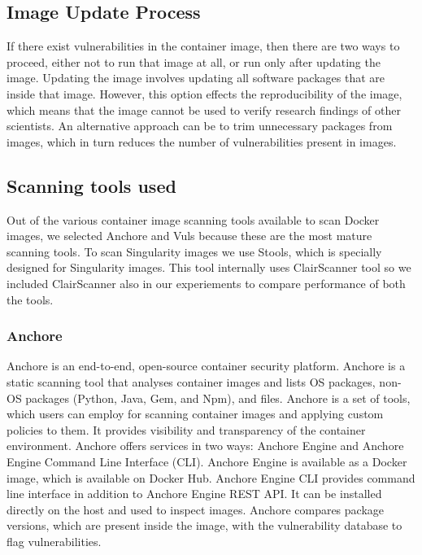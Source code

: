 \documentclass[a4paper,num-refs]{oup-contemporary}
\begin{document}
\subsection{Image Update Process}

If there exist vulnerabilities in the container image, then there are two ways
to proceed, either not to run that image at all, or run only after updating the
image. Updating the image involves updating all software packages that are
inside that image. However, this option effects the reproducibility
of the image, which means that the image cannot be used to verify research
findings of other scientists. An alternative approach can be to trim unnecessary
packages from images, which in turn reduces the number of vulnerabilities
present in images.


\subsection{Scanning tools used}

Out of the various container image scanning tools available to scan Docker images,
we selected Anchore
and Vuls because these are the most mature scanning tools. To scan Singularity images
we use Stools, which is specially designed for Singularity images. This tool internally uses
ClairScanner tool so we included ClairScanner also in our experiements to compare
performance of both the tools.

\subsubsection{Anchore}

Anchore is an end-to-end, open-source container security platform. Anchore
is a static
scanning tool that analyses container images and lists OS
packages, non-OS packages (Python, Java, Gem, and Npm), and files.
Anchore is a set of tools, which users can
employ for scanning container images and applying custom policies to them.
It provides visibility and transparency of the container environment.
Anchore offers services in two ways: Anchore Engine and Anchore Engine
Command Line Interface (CLI). Anchore Engine is available as a Docker
image, which is available on Docker Hub. Anchore Engine CLI provides
command line interface in addition to Anchore Engine REST API. It can be
installed directly on the host and used to inspect images.
Anchore compares package versions, which are present inside the
image, with the vulnerability database to flag vulnerabilities.
\end{document}
